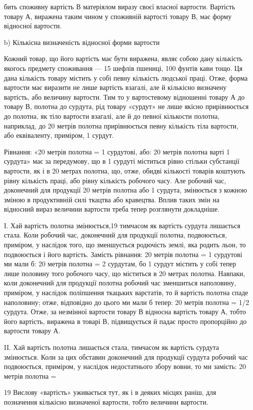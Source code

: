 бить споживну вартість В матеріялом виразу своєї власної вартости.
Вартість товару А, виражена таким чином у споживній
вартості товару В, має форму відносної вартости.

b) Кількісна визначеність відносної форми вартости

Кожний товар, що його вартість має бути виражена, являє собою
дану кількість якогось предмету споживання — 15 шефлів
пшениці, 100 фунтів кави тощо. Ця дана кількість товару містить
у собі певну кількість людської праці. Отже, форма вартости має
виразити не лише вартість взагалі, але й кількісно визначену
вартість, або величину вартости. Тим то у вартостевому відношенні
товару А до товару В, полотна до сурдута, рід товару «сурдут»
не лише якісно прирівнюється до полотна, як тіло вартости
взагалі, але й до певної кількости полотна, наприклад, до 20 метрів
полотна прирівнюється певну кількість тіла вартости, або
еквіваленту, приміром, 1 сурдут.

Рівнання: «20 метрів полотна = 1 сурдутові, або: 20 метрів
полотна варті 1 сурдута» має за передумову, що в 1 сурдуті міститься
рівно стільки субстанції вартости, як і в 20 метрах полотна,
що, отже, обидві кількості товарів коштують рівну кількість
праці, або рівну кількість робочого часу. Але робочий час,
доконечний для продукції 20 метрів полотна або 1 сурдута, змінюється
з кожною зміною в продуктивній силі ткацтва або кравецтва.
Вплив таких змін на відносний вираз величини вартости
треба тепер розглянути докладніше.

I. Хай вартість полотна змінюється,19 тимчасом як вартість
сурдута лишається стала. Коли робочий час, доконечний для продукції
полотна, подвоюється, приміром, у наслідок того, що зменшується
родючість землі, яка родить льон, то подвоюється і його
вартість. Замість рівнання: 20 метрів полотна = 1 сурдутові ми
мали б: 20 метрів полотна = 2 сурдутам, бо 1 сурдут містить у
собі тепер лише половину того робочого часу, що міститься в
20 метрах полотна. Навпаки, коли доконечний для продукції
полотна робочий час зменшиться наполовину, приміром, у наслідок
поліпшення ткацьких варстатів, то й вартість полотна спаде
наполовину; отже, відповідно до цього ми мали б тепер: 20 метрів
полотна = 1/2 сурдута. Отже, за незмінної вартости товару В
відносна вартість товару А, тобто його вартість, виражена в товарі
В, підвищується й падає просто пропорційно до вартости
товару А.

II. Хай вартість полотна лишається стала, тимчасом як вартість
сурдута змінюється. Коли за цих обставин доконечний для
продукції сурдута робочий час подвоюється, приміром, у наслідок
недостатнього збору вовни, то ми замість: 20 метрів полотна =

19 Вислову «вартість» уживається тут, як і в деяких місцях раніш,
для позначення кількісно визначеної вартости, тобто величини вартости.
